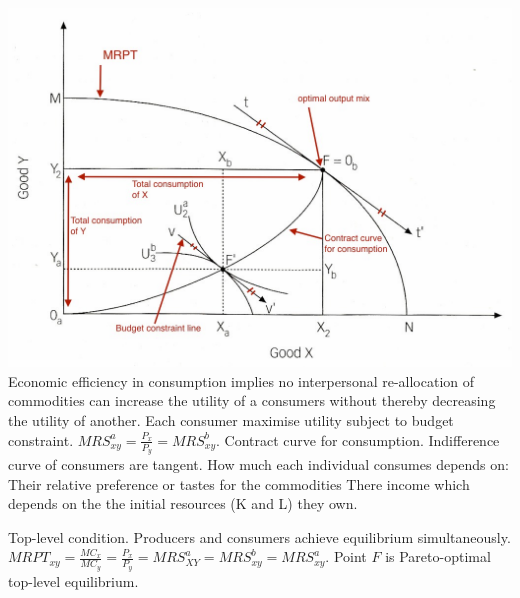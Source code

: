 \documentclass[12pt]{examnotes}
\begin{document}
\vspace{6pt}
\includegraphics[scale=0.4]{./imgs/24.jpg}
\ra Economic efficiency in consumption implies no interpersonal re-allocation of commodities can increase the utility of a consumers without thereby decreasing the utility of another. 
\ra Each consumer maximise utility subject to budget constraint.
\ra $MRS^a_{xy}=\displaystyle \frac{P_x}{P_y}=MRS^b_{xy}$.
\ra Contract curve for consumption. Indifference curve of consumers are tangent. 
\ra How much each individual consumes depends on:
 Their relative preference or tastes for the commodities
 There income which depends on the the initial resources (K and L) they own.

\ra Top-level condition.
\ra Producers and consumers achieve equilibrium simultaneously.
\ra $MRPT_{xy}=\displaystyle\frac{MC_x}{MC_y}=\frac{P_x}{P_y}=MRS^a_{XY}=MRS^b_{xy}=MRS^a_{xy}$.
\ra Point $F$ is Pareto-optimal top-level equilibrium.
\end{document}
